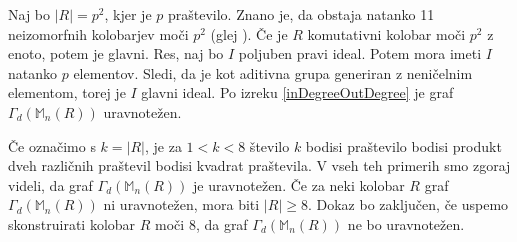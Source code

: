 \documentclass[a4paper, 12pt]{amsart}
\theoremstyle{definition} %
\theoremstyle{plain} %
\newcommand{\M}{\mathbb M}
\begin{document}
Naj bo $|R|=p^2$, kjer je $p$ praštevilo. Znano je, da obstaja natanko 11 neizomorfnih kolobarjev moči $p^2$ (glej \cite{Fine}). Če je $R$ komutativni kolobar moči $p^2$ z enoto, potem je glavni. Res, naj bo $I$ poljuben pravi ideal. Potem mora imeti $I$ natanko $p$ elementov. Sledi, da je kot aditivna grupa generiran z neničelnim elementom, torej je $I$ glavni ideal. Po izreku \ref{inDegreeOutDegree} je graf $\Gamma_d(\M_n(R))$  uravnotežen.

Če označimo s $k=|R|$,  je za $1<k<8$ število $k$ bodisi praštevilo bodisi produkt dveh različnih praštevil bodisi kvadrat praštevila. V vseh teh primerih smo zgoraj videli, da graf $\Gamma_d(\M_n(R))$ je uravnotežen. Če za neki kolobar $R$ graf $\Gamma_d(\M_n(R))$ ni uravnotežen, mora biti  $|R|\ge 8$. Dokaz bo zaključen, če uspemo skonstruirati kolobar $R$  moči 8, da graf $\Gamma_d(\M_n(R))$ ne bo uravnotežen.
\end{document}
